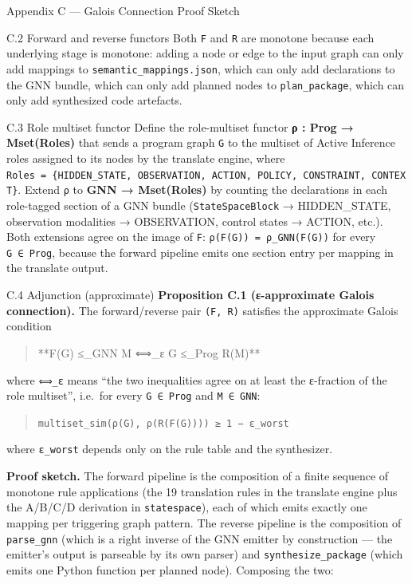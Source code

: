 \documentclass[
  ignorenonframetext,
]{beamer}
\begin{document}
\begin{frame}[fragile]{Appendix C --- Galois Connection Proof Sketch}
\begin{block}{C.2 Forward and reverse functors}
Both \texttt{F} and \texttt{R} are monotone because each underlying
stage is monotone: adding a node or edge to the input graph can only add
mappings to \texttt{semantic\_mappings.json}, which can only add
declarations to the GNN bundle, which can only add planned nodes to
\texttt{plan\_package}, which can only add synthesized code artefacts.
\end{block}

\begin{block}{C.3 Role multiset functor}
\protect{}\label{c.3-role-multiset-functor}
Define the role-multiset functor \textbf{ρ : Prog → Mset(Roles)} that
sends a program graph \texttt{G} to the multiset of Active Inference
roles assigned to its nodes by the translate engine, where
\texttt{Roles\ =\ \{HIDDEN\_STATE,\ OBSERVATION,\ ACTION,\ POLICY,\ CONSTRAINT,\ CONTEXT\}}.
Extend \texttt{ρ} to \textbf{GNN → Mset(Roles)} by counting the
declarations in each role-tagged section of a GNN bundle
(\texttt{StateSpaceBlock} → HIDDEN\_STATE, observation modalities →
OBSERVATION, control states → ACTION, etc.). Both extensions agree on
the image of \texttt{F}: \texttt{ρ(F(G))\ =\ ρ\_GNN(F(G))} for every
\texttt{G\ ∈\ Prog}, because the forward pipeline emits one section
entry per mapping in the translate output.
\end{block}

\begin{block}{C.4 Adjunction (approximate)}
\protect{}\label{c.4-adjunction-approximate}
\textbf{Proposition C.1 (ε-approximate Galois connection).} The
forward/reverse pair \texttt{(F,\ R)} satisfies the approximate Galois
condition

\begin{quote}
**F(G) ≤\_GNN M ⟺\_ε G ≤\_Prog R(M)**
\end{quote}

where \texttt{⟺\_ε} means ``the two inequalities agree on at least the
ε-fraction of the role multiset'', i.e.~for every \texttt{G\ ∈\ Prog}
and \texttt{M\ ∈\ GNN}:

\begin{quote}
\texttt{multiset\_sim(ρ(G),\ ρ(R(F(G))))\ ≥\ 1\ −\ ε\_worst}
\end{quote}

where \texttt{ε\_worst} depends only on the rule table and the
synthesizer.

\textbf{Proof sketch.} The forward pipeline is the composition of a
finite sequence of monotone rule applications (the 19 translation rules
in the translate engine plus the A/B/C/D derivation in
\texttt{statespace}), each of which emits exactly one mapping per
triggering graph pattern. The reverse pipeline is the composition of
\texttt{parse\_gnn} (which is a right inverse of the GNN emitter by
construction --- the emitter's output is parseable by its own parser)
and \texttt{synthesize\_package} (which emits one Python function per
planned node). Composing the two:


\end{block}
\end{frame}
\end{document}
